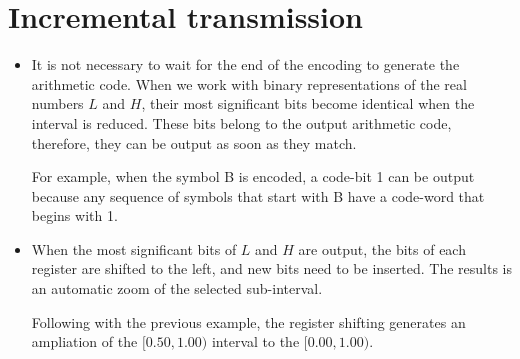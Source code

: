 \section{Incremental transmission}
\begin{itemize}
\item
  It is not necessary to wait for the end of the encoding to generate
  the arithmetic code. When we work with binary representations of the
  real numbers \(L\) and \(H\), their most significant bits become
  identical when the interval is reduced. These bits belong to the
  output arithmetic code, therefore, they can be output as soon as they
  match.

  For example, when the symbol B is encoded, a code-bit 1 can be output
  because any sequence of symbols that start with B have a code-word
  that begins with 1.
\item
  When the most significant bits of \(L\) and \(H\) are output, the bits
  of each register are shifted to the left, and new bits need to be
  inserted. The results is an automatic zoom of the selected
  sub-interval.

  Following with the previous example, the register shifting generates
  an ampliation of the \([0.50,1.00)\) interval to the \([0.00,1.00)\).
\end{itemize}


